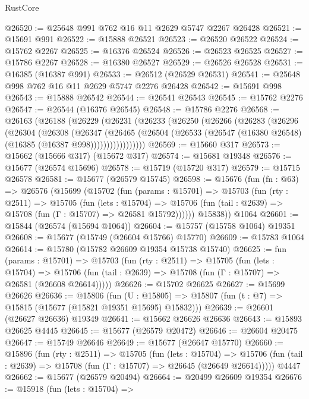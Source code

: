 \begin{lexlean}{RustCore}
\begin{coremodule}
@26520 := @25648 @991 @762 @16 @11 @2629 @5747 @2267 @26428
@26521 := @15691 @991
@26522 := @15888 @26521
@26523 := @26520 @26522
@26524 := @15762 @2267
@26525 := @16376 @26524
@26526 := @26523 @26525
@26527 := @15786 @2267
@26528 := @16380 @26527
@26529 := @26526 @26528
@26531 := @16385 (@16387 @991)
@26533 := @26512 (@26529 @26531)
@26541 := @25648 @998 @762 @16 @11 @2629 @5747 @2276 @26428
@26542 := @15691 @998
@26543 := @15888 @26542
@26544 := @26541 @26543
@26545 := @15762 @2276
@26547 := @26544 (@16376 @26545)
@26548 := @15786 @2276
@26568 := @26163
    (@26188
      (@26229
        (@26231
          (@26233
            (@26250
              (@26266
                (@26283
                  (@26296
                    (@26304
                      (@26308
                        (@26347
                          (@26465
                            (@26504
                              (@26533 (@26547 (@16380 @26548) (@16385 (@16387 @998)))))))))))))))))
@26569 := @15660 @317
@26573 := @15662 (@15666 @317) (@15672 @317)
@26574 := @15681 @19348
@26576 := @15677 (@26574 @15696)
@26578 := @15719 (@15720 @317)
@26579 := @15715 @26578
@26581 := @15677 (@26579 @15745)
@26598 := @15676
    (fun (fn : @63) =>
    @26576
      (@15699
        (@15702
          (fun (params : @15701) =>
          @15703
            (fun (rty : @2511) =>
            @15705
              (fun (lets : @15704) =>
              @15706 (fun (tail : @2639) => @15708 (fun (Γ : @15707) => @26581 @15792))))))
        @15838))
    @1064
@26601 := @15844 (@26574 (@15694 @1064))
@26604 := @15757 (@15758 @1064) @19351
@26608 := @15677 (@15749 (@26604 @15766) @15770)
@26609 := @15783 @1064
@26614 := @15780 (@15782 @26609 @19354 @15738 @15740)
@26625 := fun (params : @15701) =>
  @15703
    (fun (rty : @2511) =>
    @15705
      (fun (lets : @15704) =>
      @15706 (fun (tail : @2639) => @15708 (fun (Γ : @15707) => @26581 (@26608 @26614)))))
@26626 := @15702 @26625
@26627 := @15699 @26626
@26636 := @15806
    (fun (U : @15805) => @15807 (fun (t : @7) => @15815 (@15677 (@15821 @19351 @15695) @15832)))
@26639 := @26601 (@26627 @26636) @19349
@26641 := @15662 @26626 @26636
@26643 := @15893 @26625 @4445
@26645 := @15677 (@26579 @20472)
@26646 := @26604 @20475
@26647 := @15749 @26646
@26649 := @15677 (@26647 @15770)
@26660 := @15896
    (fun (rty : @2511) =>
    @15705
      (fun (lets : @15704) =>
      @15706 (fun (tail : @2639) => @15708 (fun (Γ : @15707) => @26645 (@26649 @26614)))))
    @4447
@26662 := @15677 (@26579 @20494)
@26664 := @20499 @26609 @19354
@26676 := @15918
    (fun (lets : @15704) =>

\end{coremodule}
\end{lexlean}
